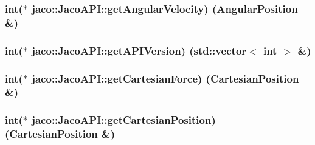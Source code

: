 \subsubsection[{\texorpdfstring{get\+Angular\+Velocity}{getAngularVelocity}}]{\setlength{\rightskip}{0pt plus 5cm}int($\ast$ jaco\+::\+Jaco\+A\+P\+I\+::get\+Angular\+Velocity) ({\bf Angular\+Position} \&)}\hypertarget{classjaco_1_1JacoAPI_af50f11de8f7c2b661f53d76f576eb3ae}{}\label{classjaco_1_1JacoAPI_af50f11de8f7c2b661f53d76f576eb3ae}
\subsubsection[{\texorpdfstring{get\+A\+P\+I\+Version}{getAPIVersion}}]{\setlength{\rightskip}{0pt plus 5cm}int($\ast$ jaco\+::\+Jaco\+A\+P\+I\+::get\+A\+P\+I\+Version) (std\+::vector$<$ int $>$ \&)}\hypertarget{classjaco_1_1JacoAPI_a90f1033a1174ea7f97d48186b7ca867a}{}\label{classjaco_1_1JacoAPI_a90f1033a1174ea7f97d48186b7ca867a}
\subsubsection[{\texorpdfstring{get\+Cartesian\+Force}{getCartesianForce}}]{\setlength{\rightskip}{0pt plus 5cm}int($\ast$ jaco\+::\+Jaco\+A\+P\+I\+::get\+Cartesian\+Force) ({\bf Cartesian\+Position} \&)}\hypertarget{classjaco_1_1JacoAPI_af82e531abda1dd3e87ab33f1f5474ca5}{}\label{classjaco_1_1JacoAPI_af82e531abda1dd3e87ab33f1f5474ca5}
\subsubsection[{\texorpdfstring{get\+Cartesian\+Position}{getCartesianPosition}}]{\setlength{\rightskip}{0pt plus 5cm}int($\ast$ jaco\+::\+Jaco\+A\+P\+I\+::get\+Cartesian\+Position) ({\bf Cartesian\+Position} \&)}\hypertarget{classjaco_1_1JacoAPI_a6c3640d554617754a9ed2e875b1a2cd0}{}\label{classjaco_1_1JacoAPI_a6c3640d554617754a9ed2e875b1a2cd0}
